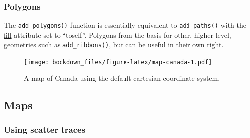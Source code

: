 \documentclass[12pt,]{isuthesis}
\newenvironment{Shaded}{\begin{snugshade}}{\end{snugshade}}
\newcommand{\KeywordTok}[1]{\textcolor[rgb]{0.13,0.29,0.53}{\textbf{{#1}}}}
\newcommand{\DataTypeTok}[1]{\textcolor[rgb]{0.13,0.29,0.53}{{#1}}}
\newcommand{\FloatTok}[1]{\textcolor[rgb]{0.00,0.00,0.81}{{#1}}}
\newcommand{\StringTok}[1]{\textcolor[rgb]{0.31,0.60,0.02}{{#1}}}
\newcommand{\OtherTok}[1]{\textcolor[rgb]{0.56,0.35,0.01}{{#1}}}
\newcommand{\NormalTok}[1]{{#1}}
\begin{document}
\hypertarget{polygons}{\subsubsection{Polygons}\label{polygons}}

The \texttt{add\_polygons()} function is essentially equivalent to
\texttt{add\_paths()} with the
\href{https://plot.ly/r/reference/\#scatter-fill}{fill} attribute set to
``toself''. Polygons from the basis for other, higher-level, geometries
such as \texttt{add\_ribbons()}, but can be useful in their own right.

\begin{Shaded}
\end{Shaded}

\begin{figure}[htbp]
\centering
\texttt{[image: bookdown\_files/figure-latex/map-canada-1.pdf]}
\caption{\label{fig:map-canada}A map of Canada using the default cartesian
coordinate system.}
\end{figure}

\subsection{Maps}\label{maps}

\subsubsection{Using scatter traces}\label{using-scatter-traces}
\end{document}
